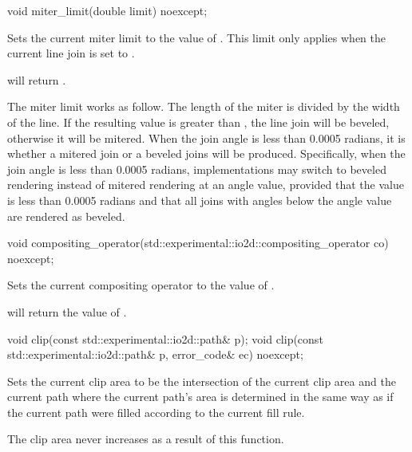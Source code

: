\begin{itemdecl}
void miter_limit(double limit) noexcept;
\end{itemdecl}
\begin{itemdescr}
	\pnum
	\effects
	Sets the current miter limit to the value of . This limit only applies when the current line join is set to .
	
	\pnum
	\postconditions
	 will return .
	
	\pnum
	\remarks
	The miter limit works as follow. The length of the miter is divided by the width of the line. If the resulting value is greater than , the line join will be beveled, otherwise it will be mitered.
	\enternote
	When the join angle is less than 0.0005 radians, it is 
	 whether a mitered join or 
	a beveled joins will be produced. Specifically, when the join angle is less 
	than 0.0005 radians, implementations may switch to beveled rendering 
	instead of mitered rendering at an \impdef angle value, provided that the 
	value is less than 0.0005 radians and that all joins with angles below the 
	\impdef angle value are rendered as beveled.
	\exitnote
\end{itemdescr}

\begin{itemdecl}
void compositing_operator(std::experimental::io2d::compositing_operator co)
  noexcept;
\end{itemdecl}
\begin{itemdescr}
	\pnum
	\effects
	Sets the current compositing operator to the value of .
	
	\pnum
	\postconditions
	 will return the value of .
\end{itemdescr}

\begin{itemdecl}
void clip(const std::experimental::io2d::path& p);
void clip(const std::experimental::io2d::path& p, error_code& ec) noexcept;
\end{itemdecl}
\begin{itemdescr}
	\pnum
	\effects
	Sets the current clip area to be the intersection of the current clip area and the current path where the current path's area is determined in the same way as if the current path were filled according to the current fill rule.
	
	\pnum
	\realnotes
	The clip area never increases as a result of this function.
\end{itemdescr}

